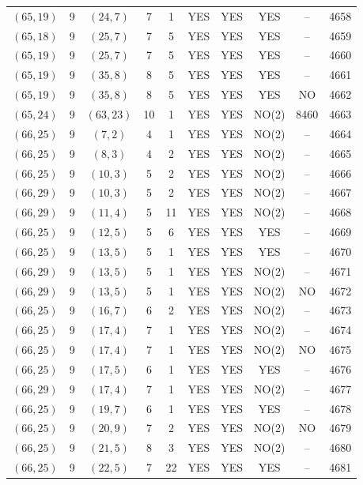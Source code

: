 \begin{longtable}{|c|c|c|c|c|c|c|c|c|c|}
$(65, 19)$ & 9 & $(24, 7)$ & 7 & 1 & YES & YES & YES & -- & 4658\\
$(65, 18)$ & 9 & $(25, 7)$ & 7 & 5 & YES & YES & YES & -- & 4659\\
$(65, 19)$ & 9 & $(25, 7)$ & 7 & 5 & YES & YES & YES & -- & 4660\\
$(65, 19)$ & 9 & $(35, 8)$ & 8 & 5 & YES & YES & YES & -- & 4661\\
$(65, 19)$ & 9 & $(35, 8)$ & 8 & 5 & YES & YES & YES & NO & 4662\\
$(65, 24)$ & 9 & $(63, 23)$ & 10 & 1 & YES & YES & NO(2) & 8460 & 4663\\
$(66, 25)$ & 9 & $(7, 2)$ & 4 & 1 & YES & YES & NO(2) & -- & 4664\\
$(66, 25)$ & 9 & $(8, 3)$ & 4 & 2 & YES & YES & NO(2) & -- & 4665\\
$(66, 25)$ & 9 & $(10, 3)$ & 5 & 2 & YES & YES & NO(2) & -- & 4666\\
$(66, 29)$ & 9 & $(10, 3)$ & 5 & 2 & YES & YES & NO(2) & -- & 4667\\
$(66, 29)$ & 9 & $(11, 4)$ & 5 & 11 & YES & YES & NO(2) & -- & 4668\\
$(66, 25)$ & 9 & $(12, 5)$ & 5 & 6 & YES & YES & YES & -- & 4669\\
$(66, 25)$ & 9 & $(13, 5)$ & 5 & 1 & YES & YES & YES & -- & 4670\\
$(66, 29)$ & 9 & $(13, 5)$ & 5 & 1 & YES & YES & NO(2) & -- & 4671\\
$(66, 29)$ & 9 & $(13, 5)$ & 5 & 1 & YES & YES & NO(2) & NO & 4672\\
$(66, 25)$ & 9 & $(16, 7)$ & 6 & 2 & YES & YES & NO(2) & -- & 4673\\
$(66, 25)$ & 9 & $(17, 4)$ & 7 & 1 & YES & YES & NO(2) & -- & 4674\\
$(66, 25)$ & 9 & $(17, 4)$ & 7 & 1 & YES & YES & NO(2) & NO & 4675\\
$(66, 25)$ & 9 & $(17, 5)$ & 6 & 1 & YES & YES & YES & -- & 4676\\
$(66, 29)$ & 9 & $(17, 4)$ & 7 & 1 & YES & YES & NO(2) & -- & 4677\\
$(66, 25)$ & 9 & $(19, 7)$ & 6 & 1 & YES & YES & YES & -- & 4678\\
$(66, 25)$ & 9 & $(20, 9)$ & 7 & 2 & YES & YES & NO(2) & NO & 4679\\
$(66, 25)$ & 9 & $(21, 5)$ & 8 & 3 & YES & YES & NO(2) & -- & 4680\\
$(66, 25)$ & 9 & $(22, 5)$ & 7 & 22 & YES & YES & YES & -- & 4681\\

\end{longtable}
